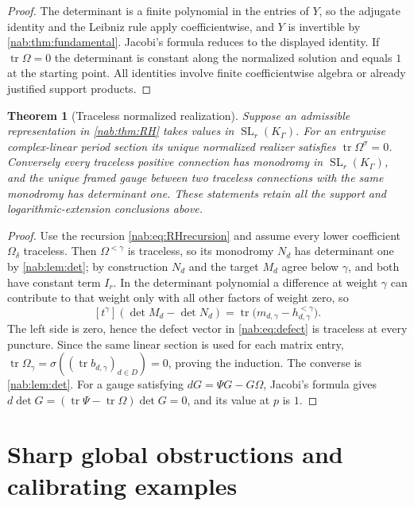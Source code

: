 \documentclass[11pt,letterpaper]{article}
\newtheorem{theorem}{Theorem}[section]
\theoremstyle{definition}
\theoremstyle{remark}
\newcommand{\K}{K_\Gamma}
\newcommand{\SL}{\operatorname{SL}}
\newcommand{\tr}{\operatorname{tr}}
\newcommand{\coeff}[1]{[t^{#1}]}
\numberwithin{equation}{section}
\begin{document}
\begin{proof}
The determinant is a finite polynomial in the entries of $Y$, so the adjugate
identity and the Leibniz rule apply coefficientwise, and $Y$ is invertible by
\cref{nab:thm:fundamental}. Jacobi's formula reduces to the displayed
identity. If $\tr\Omega=0$ the determinant is constant along the normalized
solution and equals $1$ at the starting point. All identities involve finite
coefficientwise algebra or already justified support products.
\end{proof}

\begin{theorem}[Traceless normalized realization]\label{nab:thm:SL}
Suppose an admissible representation in \cref{nab:thm:RH} takes values in
$\SL_r(\K)$. For an entrywise complex-linear period section its unique
normalized realizer satisfies $\tr\Omega^\sigma=0$. Conversely every traceless
positive connection has monodromy in $\SL_r(\K)$, and the unique framed gauge
between two traceless connections with the same monodromy has determinant one.
These statements retain all the support and logarithmic-extension conclusions
above.
\end{theorem}

\begin{proof}
Use the recursion \eqref{nab:eq:RHrecursion} and assume every lower
coefficient $\Omega_\delta$ traceless. Then $\Omega^{<\gamma}$ is traceless, so
its monodromy $N_d$ has determinant one by \cref{nab:lem:det}; by construction
$N_d$ and the target $M_d$ agree below $\gamma$, and both have constant term
$I_r$. In the determinant polynomial a difference at weight $\gamma$ can
contribute to that weight only with all other factors of weight zero, so
\[
 \coeff{\gamma}(\det M_d-\det N_d)
 =\tr\bigl(m_{d,\gamma}-h^{<\gamma}_{d,\gamma}\bigr).
\]
The left side is zero, hence the defect vector in \eqref{nab:eq:defect} is
traceless at every puncture. Since the same linear section is used for each
matrix entry,
$\tr\Omega_\gamma=\sigma((\tr b_{d,\gamma})_{d\in D})=0$, proving the
induction. The converse is \cref{nab:lem:det}. For a gauge satisfying
$dG=\Psi G-G\Omega$, Jacobi's formula gives
$d\det G=(\tr\Psi-\tr\Omega)\det G=0$, and its value at $p$ is $1$.
\end{proof}

\section{Sharp global obstructions and calibrating examples}
\label{nab:sec:examples}
\end{document}
